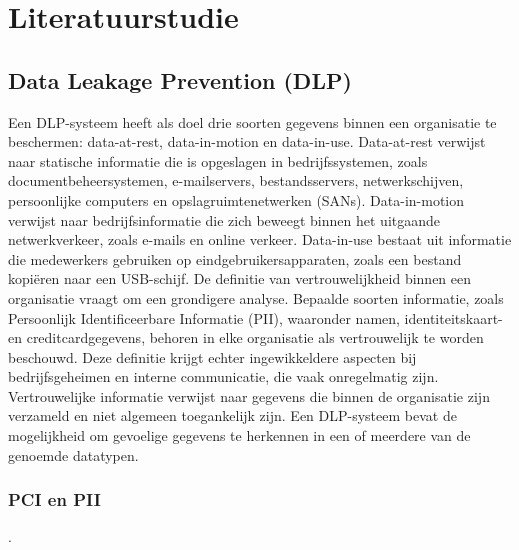 


\section{Literatuurstudie}%
\label{sec:literatuurstudie}

\subsection{Data Leakage Prevention (DLP)}%

Een DLP-systeem heeft als doel drie soorten gegevens binnen een organisatie te beschermen: data-at-rest, data-in-motion en data-in-use. 
Data-at-rest verwijst naar statische informatie die is opgeslagen in bedrijfssystemen, zoals documentbeheersystemen, e-mailservers, bestandsservers, netwerkschijven, 
persoonlijke computers en opslagruimtenetwerken (SANs). 
Data-in-motion verwijst naar bedrijfsinformatie die zich beweegt binnen het uitgaande netwerkverkeer, zoals e-mails en online verkeer. 
Data-in-use bestaat uit informatie die medewerkers gebruiken op eindgebruikersapparaten, zoals een bestand kopiëren naar een USB-schijf. 
De definitie van vertrouwelijkheid binnen een organisatie vraagt om een grondigere analyse. Bepaalde soorten informatie, zoals Persoonlijk Identificeerbare Informatie (PII), 
waaronder namen, identiteitskaart- en creditcardgegevens, behoren in elke organisatie als vertrouwelijk te worden beschouwd. 
Deze definitie krijgt echter ingewikkeldere aspecten bij bedrijfsgeheimen en interne communicatie, die vaak onregelmatig zijn. 
Vertrouwelijke informatie verwijst naar gegevens die binnen de organisatie zijn verzameld en niet algemeen toegankelijk zijn. 
Een DLP-systeem bevat de mogelijkheid om gevoelige gegevens te herkennen in een of meerdere van de genoemde datatypen.


\subsubsection{PCI en PII}
.
